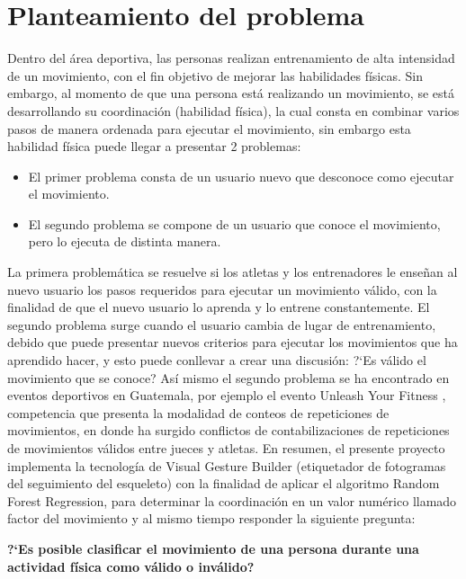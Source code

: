 \chapter{Planteamiento del problema}
Dentro del \'area deportiva, las personas realizan entrenamiento de alta intensidad de un movimiento, con el fin objetivo de mejorar las habilidades f\'isicas. Sin embargo, al momento de que una persona est\'a realizando un movimiento, se est\'a desarrollando su coordinaci\'on (habilidad f\'isica), la cual consta en combinar varios pasos de manera ordenada para ejecutar el movimiento, sin embargo esta habilidad f\'isica puede llegar a presentar 2 problemas:
\begin{itemize}
	\item El primer problema consta de un usuario nuevo que desconoce como ejecutar el movimiento.
	\item El segundo problema se compone de un usuario que conoce el movimiento, pero lo ejecuta de distinta manera.
\end{itemize} 
La primera problem\'atica se resuelve si los atletas y los entrenadores le ense\~nan al nuevo usuario los pasos requeridos para ejecutar un movimiento v\'alido, con la finalidad de que el nuevo usuario lo aprenda y lo entrene constantemente.
\medbreak
El segundo problema surge cuando el usuario cambia de lugar de entrenamiento, debido que puede presentar nuevos criterios para ejecutar los movimientos que ha aprendido hacer, y esto puede conllevar a crear una discusi\'on: ?`Es v\'alido el movimiento que se conoce?
\medbreak
\medbreak
As\'i mismo el segundo problema se ha encontrado en eventos deportivos en Guatemala, por ejemplo el evento Unleash Your Fitness \cite{unleash}, competencia que presenta la modalidad de conteos de repeticiones de movimientos, en donde ha surgido conflictos de contabilizaciones de repeticiones de  movimientos v\'alidos entre jueces y atletas.
\medbreak
\medbreak
En resumen, el presente proyecto implementa la tecnolog\'ia de Visual Gesture Builder (etiquetador de fotogramas del seguimiento del esqueleto) con la finalidad de aplicar el algoritmo Random Forest Regression, para determinar la coordinaci\'on en un valor num\'erico llamado factor del movimiento y al mismo tiempo responder la siguiente pregunta:
\medbreak
\medbreak
\begin{center}
\textbf{?`Es posible clasificar el movimiento de una persona durante una actividad f\'isica como v\'alido o inv\'alido?}
\end{center}





